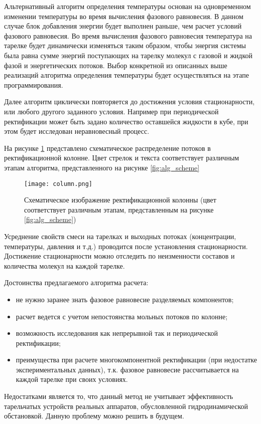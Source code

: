 Альтернативный алгоритм определения температуры основан на одновременном изменении температуры во время вычисления фазового равновесия. В данном случае блок добавления энергии будет выполнен раньше, чем расчет условий фазового равновесия. Во время вычисления фазового равновесия температура на тарелке будет динамически изменяться таким образом, чтобы энергия системы была равна сумме энергий поступающих на тарелку молекул с газовой и жидкой фазой и энергетических потоков. Выбор конкретной из описанных выше  реализаций алгоритма определения температуры будет осуществляться на этапе программирования.
 
Далее алгоритм циклически повторяется до достижения условия стационарности, или любого другого заданного условия. Например при периодической ректификации может быть задано количество оставшейся жидкости в кубе, при этом будет исследован неравновесный процесс.
 
На рисунке \ref{fig:plate_scheme} представлено схематическое распределение потоков в ректификационной колонне. Цвет стрелок и текста соответствует различным этапам алгоритма, представленного на рисунке \ref{fig:alg_scheme}


\begin{figure}[h]
	\begin{center}
		\texttt{[image: column.png]}
	\end{center}
	\caption{Схематическое изображение ректификационной колонны (цвет соответствует различным этапам, представленным на рисунке \ref{fig:alg_scheme})} \label{fig:plate_scheme}
\end{figure}

Усреднение свойств смеси на тарелках и выходных потоках (концентрации, температуры, давления и т.д.) проводится после установления стационарности. Достижение стационарности можно отследить по неизменности составов и количества молекул на каждой тарелке.

Достоинства предлагаемого алгоритма расчета:
\begin{itemize}
	\item не нужно заранее знать фазовое равновесие разделяемых компонентов;
	\item расчет ведется с учетом непостоянства мольных потоков по колонне;
	\item возможность исследования как непрерывной так и периодической ректификации;
	\item преимущества при расчете многокомпонентной ректификации (при недостатке экспериментальных данных), т.к. фазовое равновесие рассчитывается на каждой тарелке при своих условиях. 
\end{itemize}
Недостатками является то, что данный метод не учитывает эффективность тарельчатых устройств реальных аппаратов, обусловленной гидродинамической обстановкой. Данную проблему можно решить в будущем.


